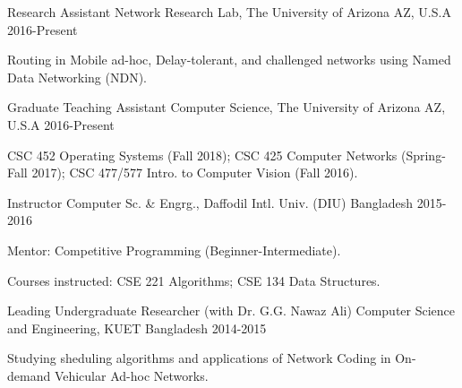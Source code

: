 

\begin{cventries}

  \cventry
    {Research Assistant} %
    {Network Research Lab, The University of Arizona} %
    {AZ, U.S.A} %
    {2016-Present} %
    {
      \begin{cvitems} %
        \item {Routing in Mobile ad-hoc, Delay-tolerant, and challenged networks using Named Data Networking (NDN).}
      \end{cvitems}
    }
    {}

  \cventry
    {Graduate Teaching Assistant} %
    {Computer Science, The University of Arizona} %
    {AZ, U.S.A} %
    {2016-Present} %
    {
      \begin{cvitems} %
        \item {CSC 452 Operating Systems (Fall 2018); CSC 425 Computer Networks (Spring-Fall 2017); CSC 477/577 Intro. to Computer Vision (Fall 2016).}
      \end{cvitems}
    }
    {}

  \cventry
    {Instructor} %
    {Computer Sc. \& Engrg., Daffodil Intl. Univ. (DIU)} %
    {Bangladesh} %
    {2015-2016} %
    {
      \begin{cvitems} %
        \item {Mentor: Competitive Programming (Beginner-Intermediate).}
        \item {Courses instructed: CSE 221 Algorithms; CSE 134 Data Structures.}
      \end{cvitems}
    }
    {}

  \cventry
    {Leading Undergraduate Researcher (with Dr. G.G. Nawaz Ali)} %
    {Computer Science and Engineering, KUET} %
    {Bangladesh} %
    {2014-2015} %
    {
      \begin{cvitems} %
        \item {Studying sheduling algorithms and applications of Network Coding in On-demand Vehicular Ad-hoc Networks.}
      \end{cvitems}
    }
    {}


\end{cventries}
